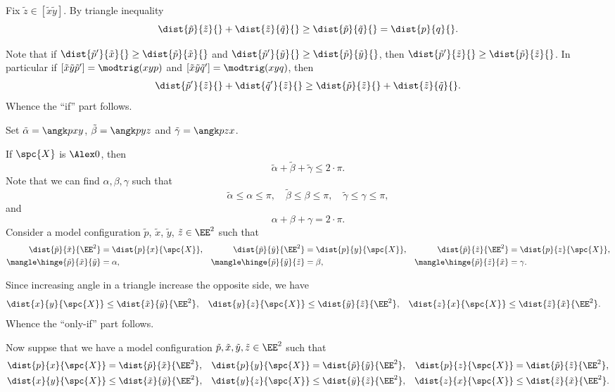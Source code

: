Fix $\tilde z\in [\tilde x\tilde y]$.
By triangle inequality 
\[\dist{\tilde p}{\tilde z}{}+\dist{\tilde z}{\tilde q}{}\ge \dist{\tilde p}{\tilde q}{}=\dist{p}{q}{}.\]

Note that if 
$\dist{\tilde p'}{\tilde x}{}\ge \dist{\tilde p}{\tilde x}{}$
and
$\dist{\tilde p'}{\tilde y}{}\ge \dist{\tilde p}{\tilde y}{}$,
then $\dist{\tilde p'}{\tilde z}{}\ge \dist{\tilde p}{\tilde z}{}$.
In particular if $[\tilde x\tilde y\tilde p']=\modtrig(xyp)$ and $[\tilde x\tilde y\tilde q']=\modtrig(xyq)$, then
\begin{align*}
 \dist{\tilde p'}{\tilde z}{}+\dist{\tilde q'}{\tilde z}{}\ge \dist{\tilde p}{\tilde z}{}+\dist{\tilde z}{\tilde q}{}.
\end{align*}
Whence the ``if'' part follows.

Set $\tilde\alpha=\angk pxy$, $\tilde\beta=\angk pyz$ and $\tilde\gamma=\angk pzx$.

If $\spc{X}$ is $\Alex0$, then
\[\tilde\alpha+\tilde\beta+\tilde\gamma\le 2\cdot \pi.\]
Note that we can find $\alpha,\beta,\gamma$ such that 
\[
\tilde\alpha\le\alpha\le\pi,
\quad \tilde\beta\le\beta\le\pi,
\quad\tilde\gamma\le\gamma\le\pi,\]
and
\[\alpha+\beta+\gamma=2\cdot \pi.\]
Consider a model configuration $\tilde p$, $\tilde x$, $\tilde y$, $\tilde z\in\EE^2$ such that 
\begin{align*}
\dist{\tilde p}{\tilde x}{\EE^2}&=\dist{p}{x}{\spc{X}},
&
\dist{\tilde p}{\tilde y}{\EE^2}&=\dist{p}{y}{\spc{X}},
&
\dist{\tilde p}{\tilde z}{\EE^2}&=\dist{p}{z}{\spc{X}},
\\
\mangle\hinge {\tilde p}{\tilde x}{\tilde y}&=\alpha,
&
\mangle\hinge {\tilde p}{\tilde y}{\tilde z}&=\beta,
&
\mangle\hinge {\tilde p}{\tilde z}{\tilde x}&=\gamma.
\end{align*}

Since increasing angle in a triangle increase the opposite side, we have 
\begin{align*}
\dist{x}{y}{\spc{X}}&\le\dist{\tilde x}{\tilde y}{\EE^2},
&
\dist{y}{z}{\spc{X}}&\le\dist{\tilde y}{\tilde z}{\EE^2},
&
\dist{z}{x}{\spc{X}}&\le\dist{\tilde z}{\tilde x}{\EE^2}.
\end{align*}
Whence the ``only-if'' part follows.

Now suppse that we have a model configuration $\tilde p,\tilde x,\tilde y,\tilde z\in\EE^2$
such that 
\begin{align*}
\dist{p}{x}{\spc{X}}&=\dist{\tilde p}{\tilde x}{\EE^2},
&
\dist{p}{y}{\spc{X}}&=\dist{\tilde p}{\tilde y}{\EE^2},
&
\dist{p}{z}{\spc{X}}&=\dist{\tilde p}{\tilde z}{\EE^2},
\\
\dist{x}{y}{\spc{X}}&\le\dist{\tilde x}{\tilde y}{\EE^2},
&
\dist{y}{z}{\spc{X}}&\le\dist{\tilde y}{\tilde z}{\EE^2},
&
\dist{z}{x}{\spc{X}}&\le\dist{\tilde z}{\tilde x}{\EE^2}.
\end{align*}


